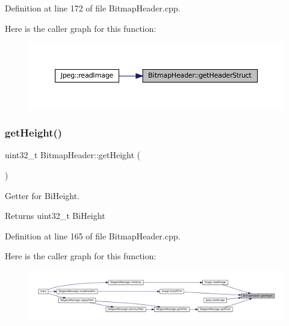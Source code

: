 Definition at line 172 of file Bitmap\+Header.\+cpp.

Here is the caller graph for this function\+:\nopagebreak
\begin{figure}[H]
\begin{center}
\leavevmode
\includegraphics[width=350pt]{classBitmapHeader_a7ac69b70fce7b54c9cd3134a0e68ea58_icgraph}
\end{center}
\end{figure}
\mbox{\label{classBitmapHeader_a106f72d6c256327342029edf8e18bde1}} 
\subsubsection{\texorpdfstring{getHeight()}{getHeight()}}
{\footnotesize\ttfamily uint32\+\_\+t Bitmap\+Header\+::get\+Height (\begin{DoxyParamCaption}{ }\end{DoxyParamCaption})}



Getter for Bi\+Height. 

\begin{DoxyReturn}{Returns}
uint32\+\_\+t Bi\+Height 
\end{DoxyReturn}


Definition at line 165 of file Bitmap\+Header.\+cpp.

Here is the caller graph for this function\+:\nopagebreak
\begin{figure}[H]
\begin{center}
\leavevmode
\includegraphics[width=350pt]{classBitmapHeader_a106f72d6c256327342029edf8e18bde1_icgraph}
\end{center}
\end{figure}
\mbox{\label{classBitmapHeader_a70702e4d8aba2a3502f776f73bfecde8}} 
